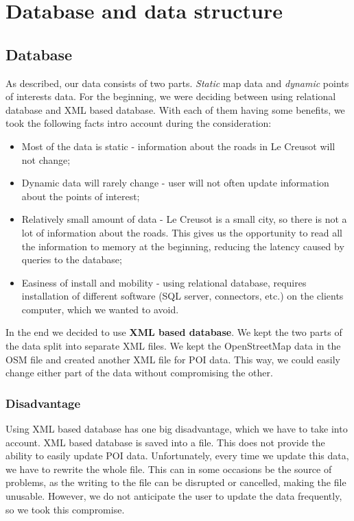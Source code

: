 
\chapter{Database and data structure} %

\label{Chapter5} %



\section{Database}
As described, our data consists of two parts. \textit{Static} map data and \textit{dynamic} points of interests data. For the beginning, we were deciding between using relational database and XML based database. With each of them having some benefits, we took the following facts intro account during the consideration:
\begin{itemize}
\item Most of the data is static - information about the roads in Le Creusot will not change;
\item Dynamic data will rarely change - user will not often update information about the points of interest;
\item Relatively small amount of data - Le Creusot is a small city, so there is not a lot of information about the roads. This gives us the opportunity to read all the information to memory at the beginning, reducing the latency caused by queries to the database;
\item Easiness of install and mobility -  using relational database, requires installation of different software (SQL server, connectors, etc.) on the clients computer, which we wanted to avoid. 
\end{itemize} 
In the end we decided to use \textbf{XML based database}. We kept the two parts of the data split into separate XML files. We kept the OpenStreetMap data in the OSM file and created another XML file for POI data. This way, we could easily change either part of the data without compromising the other.
\subsection{Disadvantage}
Using XML based database has one big disadvantage, which we have to take into account. XML based database is saved into a file. This does not provide the ability to easily update POI data. Unfortunately, every time we update this data, we have to rewrite the whole file. This can in some occasions be the source of problems, as the writing to the file can be disrupted or cancelled, making the file unusable. However, we do not anticipate the user to update the data frequently, so we took this compromise.


